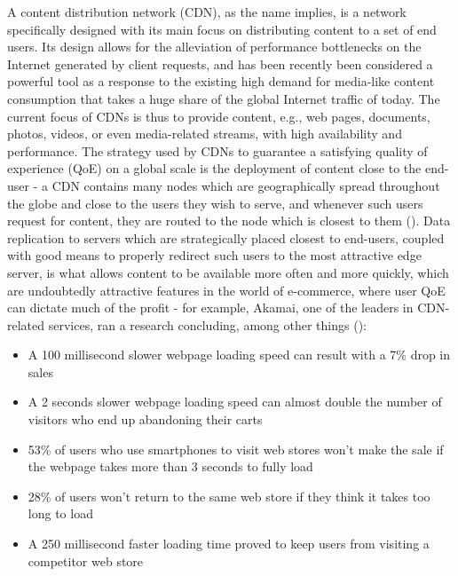     A content distribution network (CDN), as the name implies, is a network specifically designed with its  main focus on distributing content to a set of end users.
    Its design allows for the alleviation of performance bottlenecks on the Internet generated by client requests, and has been recently been considered a powerful tool as a response to the existing high demand for media-like content consumption that takes a huge share of the global Internet traffic of today.
    The current focus of CDNs is thus to provide content, e.g., web pages, documents, photos, videos, or even media-related streams, with high availability and performance.
    The strategy used by CDNs to guarantee a satisfying quality of experience (QoE) on a global scale is the deployment of content close to the end-user - a CDN contains many nodes which are geographically spread throughout the globe and close to the users they wish to serve, and whenever such users request for content, they are routed to the node which is closest to them (\cite{cookbook}).
    Data replication to servers which are strategically placed closest to end-users, coupled with good means to properly redirect such users to the most attractive edge server, is what allows content to be available more often and more quickly, which are undoubtedly attractive features in the world of e-commerce, where user QoE can dictate much of the profit - for example, Akamai, one of the leaders in CDN-related services, ran a research concluding, among other things (\cite{akamai}):

\begin{itemize}
    \item A 100 millisecond slower webpage loading speed can result with a 7\% drop in sales
    \item A 2 seconds slower webpage loading speed can almost double the number of visitors who end up abandoning their carts
    \item 53\% of users who use smartphones to visit web stores won’t make the sale if the webpage takes more than 3 seconds to fully load
    \item 28\% of users won’t return to the same web store if they think it takes too long to load
    \item A 250 millisecond faster loading time proved to keep users from visiting a competitor web store
\end{itemize}{}

